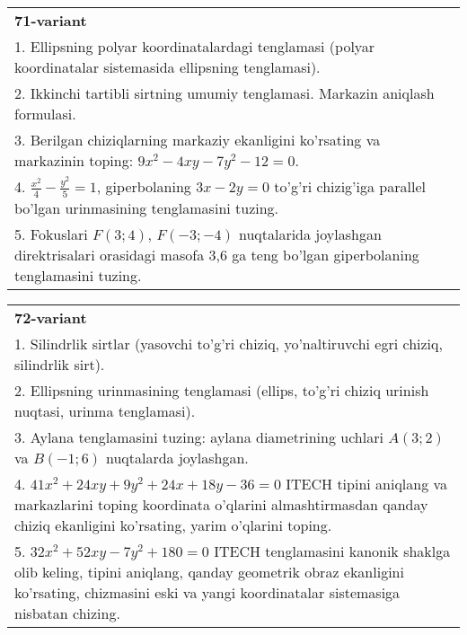 \documentclass{article}
\begin{document}
\begin{tabular}{m{17cm}}
\textbf{71-variant}\\
1. Ellipsning polyar koordinatalardagi tenglamasi (polyar koordinatalar sistemasida ellipsning tenglamasi).\\

2. Ikkinchi tartibli sirtning umumiy tenglamasi. Markazin aniqlash formulasi.\\

3. Berilgan chiziqlarning markaziy ekanligini ko'rsating va markazinin toping: $9x^{2}-4xy-7y^{2}-12=0$.\\

4. $\frac{x^{2}}{4} - \frac{y^{2}}{5} = 1$, giperbolaning $3x - 2y = 0$ to'g'ri chizig'iga parallel bo'lgan urinmasining tenglamasini tuzing.  \\

5. Fokuslari $F(3;4)$, $F(-3;-4)$ nuqtalarida joylashgan direktrisalari orasidagi masofa 3,6 ga teng bo'lgan giperbolaning tenglamasini tuzing.  
\end{tabular}
\vspace{1cm}


\begin{tabular}{m{17cm}}
\textbf{72-variant}\\
1. Silindrlik sirtlar (yasovchi to'g'ri chiziq, yo'naltiruvchi egri chiziq, silindrlik sirt).\\

2. Ellipsning urinmasining tenglamasi (ellips, to'g'ri chiziq urinish nuqtasi, urinma tenglamasi).\\

3. Aylana tenglamasini tuzing: aylana diametrining uchlari $A(3;2)$ va $B(-1;6)$ nuqtalarda joylashgan.\\

4. $41x^{2} + 24xy + 9y^{2} + 24x + 18y - 36 = 0$ ITECH tipini aniqlang va markazlarini toping koordinata o'qlarini almashtirmasdan qanday chiziq ekanligini ko'rsating, yarim o'qlarini toping.  \\

5. $32x^{2} + 52xy - 7y^{2} + 180 = 0$ ITECH tenglamasini kanonik shaklga olib keling, tipini aniqlang, qanday geometrik obraz ekanligini ko'rsating, chizmasini eski va yangi koordinatalar sistemasiga nisbatan chizing.  
\end{tabular}
\vspace{1cm}
\end{document}

